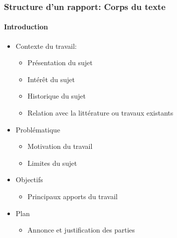 \documentclass[xcolor=table]{beamer}
\begin{document}
\begin{frame}
\frametitle{Structure d'un rapport: Corps du texte}
\framesubtitle{Introduction}

\begin{minipage}{0.60\textwidth}
	\begin{itemize}
		\item Contexte du travail:
		\begin{itemize}
			\item Présentation du sujet
			\item Intérêt du sujet
			\item Historique du sujet
			\item Relation avec la littérature ou travaux existants
		\end{itemize}
		
		\item Problématique 
		\begin{itemize}
			\item Motivation du travail
			\item Limites du sujet
		\end{itemize}
		
		\item Objectifs 
		\begin{itemize}
			\item Principaux apports du travail
		\end{itemize}
		
		\item Plan 
		\begin{itemize}
			\item Annonce et justification des parties
		\end{itemize}
		

\end{itemize}
\end{minipage}
\end{frame}
\end{document}
